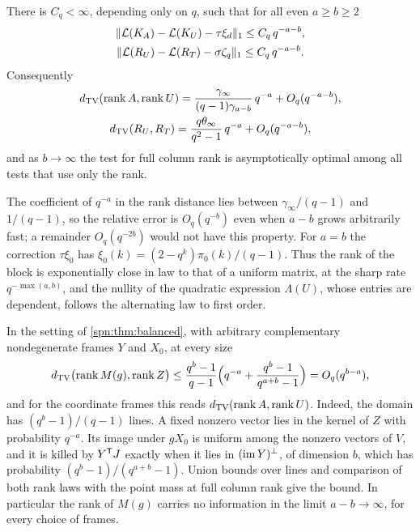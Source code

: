 \begin{theorem}\label{spn:thm:uniform-marginals}
There is $C_q<\infty$, depending only on $q$, such that for all even $a\ge b\ge2$
\begin{gather*}
 \lVert\mathcal L(K_A)-\mathcal L(K_U)-\tau\xi_d\rVert_1\le C_q\,q^{-a-b},\\
 \lVert\mathcal L(R_U)-\mathcal L(R_T)-\sigma\zeta_q\rVert_1\le C_q\,q^{-a-b}.
\end{gather*}
Consequently
\begin{gather*}
 d_{\mathrm{TV}}(\operatorname{rank} A,\operatorname{rank} U)=\frac{\gamma_\infty}{(q-1)\gamma_{a-b}}\,q^{-a}+O_q(q^{-a-b}),\\
 d_{\mathrm{TV}}(R_U,R_T)=\frac{q\theta_\infty}{q^2-1}\,q^{-a}+O_q(q^{-a-b}),
\end{gather*}
and as $b\to\infty$ the test for full column rank is asymptotically optimal among all tests that
use only the rank.
\end{theorem}

The coefficient of $q^{-a}$ in the rank distance lies between $\gamma_\infty/(q-1)$ and $1/(q-1)$,
so the relative error is $O_q(q^{-b})$ even when $a-b$ grows arbitrarily fast; a remainder
$O_q(q^{-2b})$ would not have this property. For $a=b$ the correction $\tau\xi_0$ has
$\xi_0(k)=(2-q^k)\pi_0(k)/(q-1)$. Thus the rank of the block is exponentially close in law to that
of a uniform matrix, at the sharp rate $q^{-\max(a,b)}$, and the nullity of the quadratic
expression $\Lambda(U)$, whose entries are dependent, follows the alternating law to first order.

\begin{remark}\label{spn:rem:rank-union}
In the setting of \cref{spn:thm:balanced}, with arbitrary complementary nondegenerate frames
$Y$ and $X_0$, at every size
\[
 d_{\mathrm{TV}}\bigl(\operatorname{rank} M(g),\operatorname{rank} Z\bigr)\le\frac{q^b-1}{q-1}\Bigl(q^{-a}+\frac{q^b-1}{q^{a+b}-1}\Bigr)
 =O_q(q^{b-a}),
\]
and for the coordinate frames this reads $d_{\mathrm{TV}}(\operatorname{rank} A,\operatorname{rank} U)$. Indeed, the domain has
$(q^b-1)/(q-1)$ lines. A fixed nonzero vector lies in the kernel of $Z$ with probability $q^{-a}$.
Its image under $gX_0$ is uniform among the nonzero vectors of $V$, and it is killed by
$Y^{\mathsf{T}}J$ exactly when it lies in $(\operatorname{im} Y)^\perp$, of dimension $b$, which has probability
$(q^b-1)/(q^{a+b}-1)$. Union bounds over lines and comparison of both rank laws with the point
mass at full column rank give the bound. In particular the rank of $M(g)$ carries no information
in the limit $a-b\to\infty$, for every choice of frames.
\end{remark}

